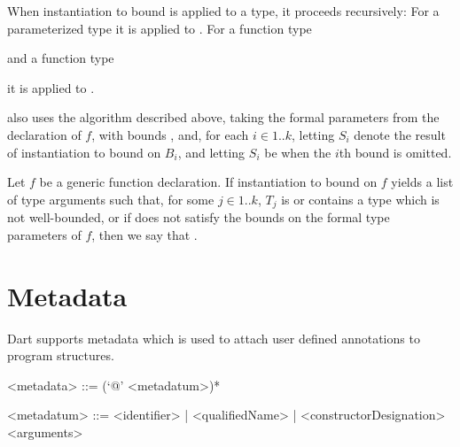 \documentclass[makeidx]{article}
\begin{document}
{

\LMHash{}%
When instantiation to bound is applied to a type, it proceeds recursively:
For a parameterized type 
it is applied to .
For a function type

\noindent
and a function type

\noindent
it is applied to .


\LMHash{}%
also uses the algorithm described above,
taking the formal parameters  from the declaration of $f$,
with bounds , and,
for each $i \in 1 .. k$,
letting $S_i$ denote the result of instantiation to bound on $B_i$,
and letting $S_i$ be \DYNAMIC{} when the $i$th bound is omitted.

\LMHash{}%
Let $f$ be a generic function declaration.
If instantiation to bound on $f$ yields
a list of type arguments  such that,
for some $j \in 1..k$,
$T_j$ is or contains a type which is not well-bounded,
or if  does not satisfy the bounds
on the formal type parameters of $f$,
then we say that
.


\section{Metadata}

\LMHash{}%
Dart supports metadata which is used to attach
user defined annotations to program structures.

\begin{grammar}
<metadata> ::= (`@' <metadatum>)*

<metadatum> ::= \gnewline{}
  <identifier> | <qualifiedName> | <constructorDesignation> <arguments>
\end{grammar}

}
\end{document}
